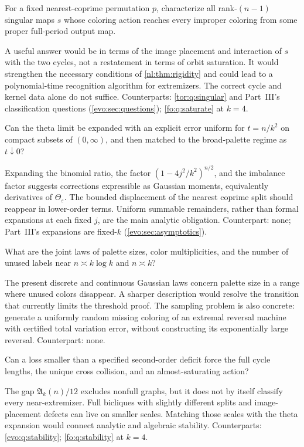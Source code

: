 \documentclass[11pt,a4paper]{article}
\numberwithin{equation}{section}
\theoremstyle{definition}
\theoremstyle{remark}
\newcommand{\nlenv}{\mathfrak A}
\begin{document}
\begin{question}\label{nl:q:classify}
For a fixed nearest-coprime permutation $p$, characterize all rank-$(n-1)$
singular maps $s$ whose coloring action reaches every improper coloring
from some proper full-period output map.
\end{question}
A useful answer would be in terms of the image placement and interaction
of $s$ with the two cycles, not a restatement in terms of orbit saturation.
It would strengthen the necessary conditions of \cref{nl:thm:rigidity} and
could lead to a polynomial-time recognition algorithm for extremizers.
The correct cycle and kernel data alone do not suffice.
Counterparts: \cref{tor:q:singular} and Part~III's classification questions (\cref{evo:sec:questions}); \cref{fo:q:saturate} at $k=4$.

\begin{question}\label{nl:q:second}
Can the theta limit be expanded with an explicit error uniform for
$t=n/k^2$ on compact subsets of $(0,\infty)$, and then matched to the
broad-palette regime as $t\downarrow0$?
\end{question}
Expanding the binomial ratio, the factor
$(1-4j^2/k^2)^{n/2}$, and the imbalance factor suggests corrections expressible
as Gaussian moments, equivalently derivatives of $\Theta_\varepsilon$.
The bounded displacement of the nearest coprime split should reappear in
lower-order terms. Uniform summable remainders, rather than formal
expansions at each fixed $j$, are the main analytic obligation.
Counterpart: none; Part~III's expansions are fixed-$k$ (\cref{evo:sec:asymptotics}).

\begin{question}\label{nl:q:occupancy}
What are the joint laws of palette sizes, color multiplicities, and the
number of unused labels near $n\asymp k\log k$ and $n\asymp k$?
\end{question}
The present discrete and continuous Gaussian laws concern palette size
in a range where unused colors disappear. A sharper description would
resolve the transition that currently limits the threshold proof. The
sampling problem is also concrete: generate a uniformly random missing
coloring of an extremal reversal machine with certified total variation
error, without constructing its exponentially large reversal.
Counterpart: none.

\begin{question}\label{nl:q:stability}
Can a loss smaller than a specified second-order deficit force the full
cycle lengths, the unique cross collision, and an almost-saturating action?
\end{question}
The gap $\nlenv_k(n)/12$ excludes nonfull graphs, but it does not by itself
classify every near-extremizer. Full bicliques with slightly different
splits and image-placement defects can live on smaller scales. Matching
those scales with the theta expansion would connect analytic and algebraic
stability.
Counterparts: \cref{evo:q:stability}; \cref{fo:q:stability} at $k=4$.
\end{document}
